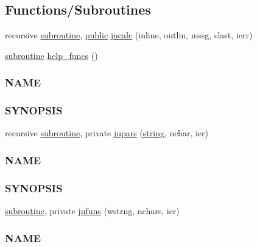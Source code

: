 \subsection*{Functions/\+Subroutines}
\begin{DoxyCompactItemize}
\item 
recursive \hyperlink{M__stopwatch_83_8txt_acfbcff50169d691ff02d4a123ed70482}{subroutine}, \hyperlink{M__stopwatch_83_8txt_a2f74811300c361e53b430611a7d1769f}{public} \hyperlink{namespacem__calculator_a2a06dd612d1c0e059f6fb2a267325201}{jucalc} (inline, outlin, mssg, slast, ierr)
\item 
\hyperlink{M__stopwatch_83_8txt_acfbcff50169d691ff02d4a123ed70482}{subroutine} \hyperlink{namespacem__calculator_a190e152c2fc309d59e75ee4645e6d261}{help\+\_\+funcs} ()
\begin{DoxyCompactList}\small\item\em \subsubsection*{N\+A\+ME}

\subsubsection*{S\+Y\+N\+O\+P\+S\+IS}\end{DoxyCompactList}\item 
recursive \hyperlink{M__stopwatch_83_8txt_acfbcff50169d691ff02d4a123ed70482}{subroutine}, private \hyperlink{namespacem__calculator_a183990dad923a0e1338b0df538c3fec8}{jupars} (\hyperlink{what__overview_81_8txt_a74cb7e955273b9f9157b4f0c18a38849}{string}, nchar, ier)
\begin{DoxyCompactList}\small\item\em \subsubsection*{N\+A\+ME}

\subsubsection*{S\+Y\+N\+O\+P\+S\+IS}\end{DoxyCompactList}\item 
\hyperlink{M__stopwatch_83_8txt_acfbcff50169d691ff02d4a123ed70482}{subroutine}, private \hyperlink{namespacem__calculator_ab9afbbbd87dd1434f72853350afec2a6}{jufuns} (wstrng, nchars, ier)
\begin{DoxyCompactList}\small\item\em \subsubsection*{N\+A\+ME}


\end{DoxyCompactList}
\end{DoxyCompactItemize}
